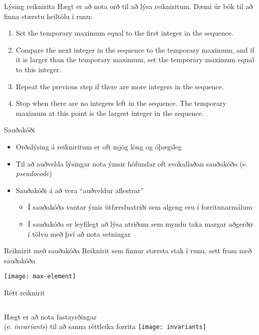 \documentclass[handout]{beamer}
\begin{document}
\begin{frame}{Lýsing reiknirita}
Hægt er að nota orð til að lýsa reikniritum. Dæmi úr bók til að finna stærstu heiltölu í runu:

\begin{enumerate}
 \item Set the temporary maximum equal to the first integer in the sequence.
 \item Compare the next integer in the sequence to the temporary maximum, and if it is larger
than the temporary maximum, set the temporary maximum equal to this integer.
 \item Repeat the previous step if there are more integers in the sequence.
 \item Stop when there are no integers left in the sequence. The temporary maximum at this
point is the largest integer in the sequence.
\end{enumerate}
\end{frame}

\begin{frame}{Sauðakóði}
\begin{itemize}
 \item Orðalýsing á reikniritum er oft mjög löng og óþægileg
 \item Til að auðvelda lýsingar nota ýmsir höfundar oft svokallaðan sauðakóða (e. \emph{pseudocode})
 \item Sauðakóði á að vera ``auðveldur aflestrar''
 \begin{itemize}
  \item Í sauðakóða vantar ýmis útfærsluatriði sem algeng eru í forritunarmálum
  \item Í sauðakóða er leyfilegt að lýsa atriðum sem myndu taka margar aðgerðir í tölvu með því að nota setningar
 \end{itemize}
\end{itemize}
\end{frame}

\begin{frame}{Reiknirit með sauðakóða}
Reiknirit sem finnur stærsta stak í runu, sett fram með sauðakóða

\texttt{[image: max-element]}
\end{frame}


\begin{frame}{Rétt reiknirit}
\begin{columns}
Hægt er að nota fastayrðingar\\
(e. \emph{invariants}) til að sanna réttleika forrita
\texttt{[image: invariants]}
\end{columns}
\end{frame}
\end{document}
